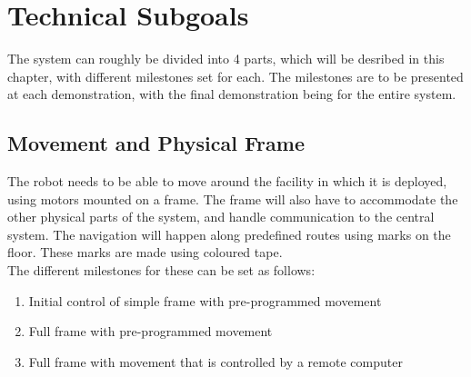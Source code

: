 \documentclass[a4paper,10pt,DIV10,openright,openbib]{scrreprt}
\begin{document}
\section{Technical Subgoals}
The system can roughly be divided into 4 parts, which will be desribed in this chapter, with different milestones set for each. The milestones are to be
presented at each demonstration, with the final demonstration being for the entire
system.

\subsection{Movement and Physical Frame}
The robot needs to be able to move around the facility in which it is deployed, using
motors mounted on a frame. The frame will also have to accommodate the other
physical parts of the system, and handle communication to the central system. 
The navigation will happen along predefined routes using marks on the floor. 
These marks are made using coloured tape.\\
The different milestones for these can be set as follows:
\begin{enumerate}
  \item Initial control of simple frame with pre-programmed movement
  \item Full frame with pre-programmed movement
  \item Full frame with movement that is controlled by a remote computer
\end{enumerate}
\end{document}
